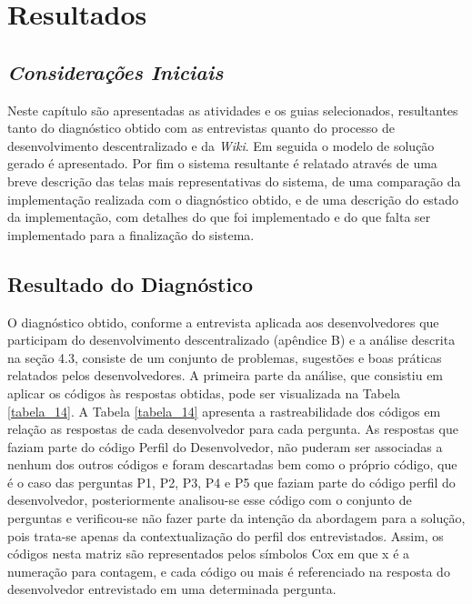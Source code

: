 \chapter[Resultados]{Resultados}

\section{\textit{Considerações Iniciais}}

Neste capítulo são apresentadas as atividades e os guias selecionados, resultantes tanto do diagnóstico obtido com as entrevistas quanto do processo de desenvolvimento descentralizado e da \textit{Wiki}. Em seguida o modelo de solução gerado é apresentado. Por fim o sistema resultante é relatado através de uma breve descrição das telas mais representativas do sistema, de uma comparação da implementação realizada com o diagnóstico obtido, e de uma descrição do estado da implementação, com detalhes do que foi implementado e do que falta ser implementado para a finalização do sistema.

\section{Resultado do Diagnóstico}

O diagnóstico obtido, conforme a entrevista aplicada aos desenvolvedores que participam do desenvolvimento descentralizado (apêndice B) e a análise descrita na seção 4.3, consiste de um conjunto de problemas, sugestões e boas práticas relatados pelos desenvolvedores. A primeira parte da análise, que consistiu em aplicar os códigos às respostas obtidas, pode ser visualizada na Tabela \ref{tabela_14}. A Tabela \ref{tabela_14} apresenta a rastreabilidade dos códigos em relação as respostas de cada desenvolvedor para cada pergunta. As respostas que faziam parte do código Perfil do Desenvolvedor, não puderam ser associadas a nenhum dos outros códigos e foram descartadas bem como o próprio código, que é o caso das perguntas P1, P2, P3, P4 e P5 que faziam parte do código perfil do desenvolvedor, posteriormente analisou-se esse código com o conjunto de perguntas e verificou-se não fazer parte da intenção da abordagem para a solução, pois trata-se apenas da contextualização do perfil dos entrevistados. Assim, os códigos nesta matriz são representados pelos símbolos Cox em que x é a numeração para contagem, e cada código ou mais é referenciado na resposta do desenvolvedor entrevistado em uma determinada pergunta.

